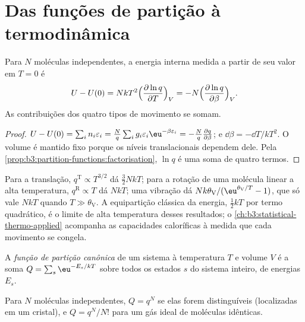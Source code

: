 \section{Das funções de partição à termodinâmica}

\begin{theorem}\label{thm:b3:partition-functions:internal-energy}
Para $N$ moléculas independentes, a energia interna medida a partir de seu valor em
$T = 0$ é
\[
  U - U(0) = NkT^2\Bigl(\frac{\partial\ln q}{\partial T}\Bigr)_V
          = -N\Bigl(\frac{\partial\ln q}{\partial\beta}\Bigr)_V .
\]
As contribuições dos quatro tipos de movimento se somam.
\end{theorem}

\begin{proof}
$U - U(0) = \sum_in_i\varepsilon_i = \frac Nq\sum_ig_i\varepsilon_i\eu^{-\beta\varepsilon_i} = -\frac Nq\frac{\partial q}{\partial\beta}$;
e $\dd\beta = -\dd T/kT^2$. O volume é mantido fixo porque os níveis translacionais
dependem dele. Pela \cref{prop:b3:partition-functions:factorisation}, $\ln q$ é uma
soma de quatro termos.
\end{proof}

Para a translação, $q^{\mathrm T} \propto T^{3/2}$ dá $\frac32NkT$; para a rotação de uma molécula
linear a alta temperatura, $q^{\mathrm R} \propto T$ dá $NkT$; uma vibração dá
$Nk\theta_{\mathrm V}/(\eu^{\theta_{\mathrm V}/T} - 1)$, que só vale $NkT$ quando $T \gg \theta_{\mathrm V}$. A
equipartição clássica da energia, $\frac12kT$ por termo quadrático, é o limite de
alta temperatura desses resultados; o \cref{ch:b3:statistical-thermo-applied}
acompanha as capacidades caloríficas à medida que cada movimento se congela.

\begin{definition}\label{def:b3:partition-functions:canonical}
A \emph{função de partição canônica} de um
sistema à temperatura $T$ e volume $V$ é a soma $Q = \sum_s\eu^{-E_s/kT}$ sobre todos os
estados $s$ do sistema inteiro, de energias $E_s$.
\end{definition}

\begin{proposition}\label{prop:b3:partition-functions:canonical}
Para $N$ moléculas independentes, $Q = q^N$ se elas forem distinguíveis (localizadas em
um cristal), e $Q = q^N/N!$ para um gás ideal de moléculas idênticas.
\end{proposition}

